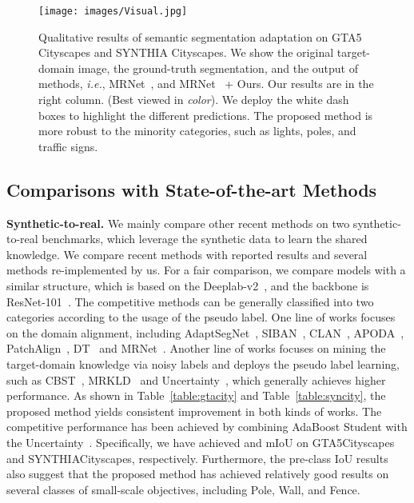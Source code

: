 \documentclass[journal]{IEEEtran}
\def\ie{\emph{i.e.}}
\begin{document}
\begin{figure}[t]
\begin{center}
     \texttt{[image: images/Visual.jpg]}
\end{center} 
\vspace{-.3in}
      \caption{  Qualitative results of semantic segmentation adaptation on GTA5  Cityscapes and SYNTHIA  Cityscapes. We show the original target-domain image, the ground-truth segmentation, and the output of methods, \ie, MRNet~\cite{zheng2019unsupervised}, and MRNet~\cite{zheng2019unsupervised} + Ours.  Our results are in the right column. (Best viewed in \emph{color}). We deploy the white dash boxes to highlight the different predictions. The proposed method is more robust to the minority categories, such as lights, poles, and traffic signs.}
      \label{fig:result}
\end{figure}

\subsection{Comparisons with State-of-the-art Methods} \noindent\textbf{Synthetic-to-real.} We mainly compare other recent methods on two synthetic-to-real benchmarks, which leverage the synthetic data to learn the shared knowledge. We compare recent methods with reported results and several methods re-implemented by us. 
For a fair comparison, we compare models with a similar structure, which is based on the Deeplab-v2~\cite{chen2017deeplab}, and the backbone is ResNet-101~\cite{he2016deep}. 
The competitive methods can be generally classified into two categories according to the usage of the pseudo label. One line of works focuses on the domain alignment, including AdaptSegNet~\cite{tsai2018learning}, SIBAN~\cite{luo2019significance}, CLAN~\cite{luo2019taking}, APODA~\cite{yang2020adversarial}, PatchAlign~\cite{tsai2019domain}, DT~\cite{wang2020differential} and MRNet~\cite{zheng2019unsupervised}. Another line of works focuses on mining the target-domain knowledge via noisy labels and deploys the pseudo label learning, such as CBST~\cite{zou2018unsupervised}, MRKLD~\cite{zou2019confidence} and  Uncertainty~\cite{zheng2020unsupervised}, which generally achieves higher performance. 
As shown in Table~\ref{table:gtacity} and Table~\ref{table:syncity}, the proposed method yields consistent improvement in both kinds of works. The competitive performance has been achieved by combining AdaBoost Student with the Uncertainty~\cite{zheng2020unsupervised}. Specifically, we have achieved  and  mIoU on GTA5Cityscapes and SYNTHIACityscapes, respectively. Furthermore, the pre-class IoU results also suggest that the proposed method has achieved relatively good results on several classes of small-scale objectives, including Pole, Wall, and Fence.
\end{document}
